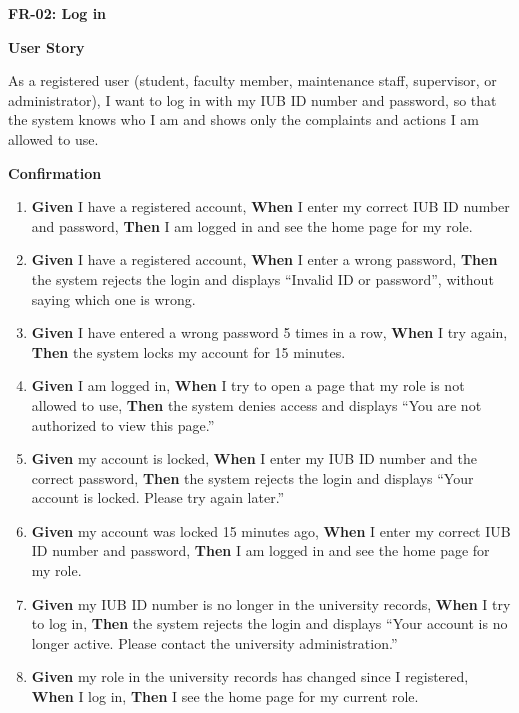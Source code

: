 \noindent\textbf{FR-02: Log in}\par\nopagebreak[4]\smallskip
\noindent\textbf{User Story}\par\nopagebreak[4]
\noindent As a registered user (student, faculty member, maintenance staff, supervisor, or administrator), I want to log in with my IUB ID number and password, so that the system knows who I am and shows only the complaints and actions I am allowed to use.\par\smallskip
{\makeatletter
{}
\makeatother
\noindent\textbf{Confirmation}\par\nopagebreak[4]\vspace{-6pt}\nopagebreak[4]
\begin{enumerate}\setlength{\itemsep}{2pt}\setlength{\parsep}{0pt}\setlength{\topsep}{2pt}\setlength{\partopsep}{0pt}
  \item \textbf{Given} I have a registered account, \textbf{When} I enter my correct IUB ID number and password, \textbf{Then} I am logged in and see the home page for my role.
  \item \textbf{Given} I have a registered account, \textbf{When} I enter a wrong password, \textbf{Then} the system rejects the login and displays ``Invalid ID or password'', without saying which one is wrong.
  \item \textbf{Given} I have entered a wrong password 5 times in a row, \textbf{When} I try again, \textbf{Then} the system locks my account for 15 minutes.
  \item \textbf{Given} I am logged in, \textbf{When} I try to open a page that my role is not allowed to use, \textbf{Then} the system denies access and displays ``You are not authorized to view this page.''
  \item \textbf{Given} my account is locked, \textbf{When} I enter my IUB ID number and the correct password, \textbf{Then} the system rejects the login and displays ``Your account is locked. Please try again later.''
  \item \textbf{Given} my account was locked 15 minutes ago, \textbf{When} I enter my correct IUB ID number and password, \textbf{Then} I am logged in and see the home page for my role.
  \item \textbf{Given} my IUB ID number is no longer in the university records, \textbf{When} I try to log in, \textbf{Then} the system rejects the login and displays ``Your account is no longer active. Please contact the university administration.''
  \item \textbf{Given} my role in the university records has changed since I registered, \textbf{When} I log in, \textbf{Then} I see the home page for my current role.
\end{enumerate}}
\medskip
 
